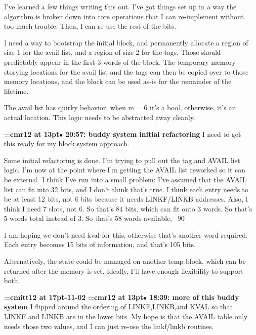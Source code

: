 I've learned a few things writing this out. I've got things set up in a way the algorithm is broken down into core operations that I can re-implement without too much trouble. Then, I can re-use the rest of the bits.
\par

I need a way to bootstrap the initial block, and permanently allocate a region of size 1 for the avail list, and a region of size 2 for the tags. Those should predictably appear in the first 3 words of the block. The temporary memory storying locations for the avail list and the tags can then be copied over to those memory locations, and the block can be used as-is for the remainder of the lifetime.
\par

The avail list has quirky behavior. when m = 6 it's a bool, otherwise, it's an actual location. This logic needs to be abstracted away cleanly.
\par

{\smallskip\noindent\bf\font\titlefont=cmr12 at 13pt\titlefont $\bullet$ 20:57: buddy system initial refactoring}\smallskip
I need to get this ready for my block system approach.
\par

Some initial refactoring is done. I'm trying to pull out the tag and AVAIL list logic. I'm now at the point where I'm getting the AVAIL list reworked so it can be external. I think I've run into a small problem: I've assumed that the AVAIL list can fit into 32 bits, and I don't think that's true. I think each entry needs to be at least 12 bits, not 6 bits because it needs LINKF/LINKB addresses. Also, I think I need 7 slots, not 6. So that's 84 bits, which can fit onto 3 words. So that's 5 words total instead of 3. So that's 58 words available, ~90%
\par

I am hoping we don't need kval for this, otherwise that's another word required. Each entry becomes 15 bits of information, and that's 105 bits.
\par

Alternatively, the state could be managed on another temp block, which can be returned after the memory is set. Ideally, I'll have enough flexibility to support both.
\par

{\medskip\noindent\bf\font\titlefont=cmitt12 at 17pt-11-02}\medskip
{\smallskip\noindent\bf\font\titlefont=cmr12 at 13pt\titlefont $\bullet$ 18:39: more of this buddy system}\smallskip
I flipped around the ordering of LINKF,LINKB,and KVAL so that LINKF and LINKB are in the lower bits. My hope is that the AVAIL table only needs those two values, and I can just re-use the linkf/linkb routines.
\par

